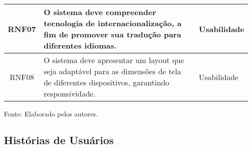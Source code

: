\documentclass[
    12pt,               %
    openright,          %
    oneside,
    a4paper,            %
    BIBLATEX,           %
    TODO,               %
    english,            %
    brazil              %
    ]{ifsp-spo-inf-ctds}
\begin{document}
\begin{center}
\begin{quadro}[h]
\begin{tabulary}{1.0\textwidth}{|C|p{25em}|p{7em}|}
                \hline
                RNF07 & O sistema deve compreender tecnologia de internacionalização, a fim de promover sua tradução para diferentes idiomas. & Usabilidade\\
                \hline
                RNF08 & O sistema deve apresentar um layout que seja adaptável para as dimensões de tela de diferentes dispositivos, garantindo responsividade. & Usabilidade\\
                \hline
                \end{tabulary}
                \label{tab:req_nfunc}
                \centering
                
               \footnotesize Fonte: Elaborado pelos autores.
                \end{quadro}
            \end{center}

\subsection{Histórias de Usuários}
\end{document}
